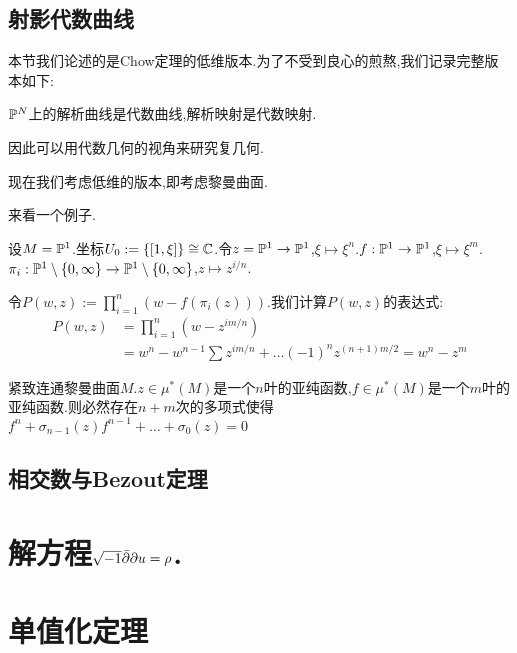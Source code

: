 \subsection*{射影代数曲线}
本节我们论述的是Chow定理的低维版本.为了不受到良心的煎熬,我们记录完整版本如下:
\begin{theorem}[Chow定理]
	$\mathbb{P}^N$上的解析曲线是代数曲线,解析映射是代数映射.
\end{theorem}
因此可以用代数几何的视角来研究复几何.

现在我们考虑低维的版本,即考虑黎曼曲面.

来看一个例子.

设$M=\mathbb{P}^1$.坐标$U_0:=\{[1,\xi]\}\cong \mathbb{C}$.令$z=\mathbb{P}^1 \to \mathbb{P}^1$,$\xi \mapsto \xi^n$.$f:\mathbb{P}^1 \to \mathbb{P}^1$,$\xi \mapsto \xi^m$.$\pi_i:\mathbb{P}^1\setminus \{0,\infty\} \to \mathbb{P}^1 \setminus \{0,\infty\}$,$z \mapsto z^{i/n}$.

令$P(w,z):=\prod_{i=1}^n(w-f(\pi_i(z)))$.我们计算$P(w,z)$的表达式:
\begin{align*}
	P(w,z)&=\prod_{i=1}^n(w-z^{im/n})\\&=w^n-w^{n-1}\sum z^{im/n}+\dots (-1)^n z^{(n+1)m/2}=w^n-z^m
\end{align*}

\begin{theorem}
	紧致连通黎曼曲面$M$.$z \in \mu^*(M)$是一个$n$叶的亚纯函数,$f\in \mu^*(M)$是一个$m$叶的亚纯函数.则必然存在$n+m$次的多项式使得$f^n+\sigma_{n-1}(z)f^{n-1}+\dots+\sigma_0(z)=0$
\end{theorem}
\subsection*{相交数与Bezout定理}
\section{解方程$\sqrt{-1} \bar{\partial} \partial u=\rho$.}
\section{单值化定理}
\ifx\allfiles\undefined
	
	
	
	
	\else
	\fi